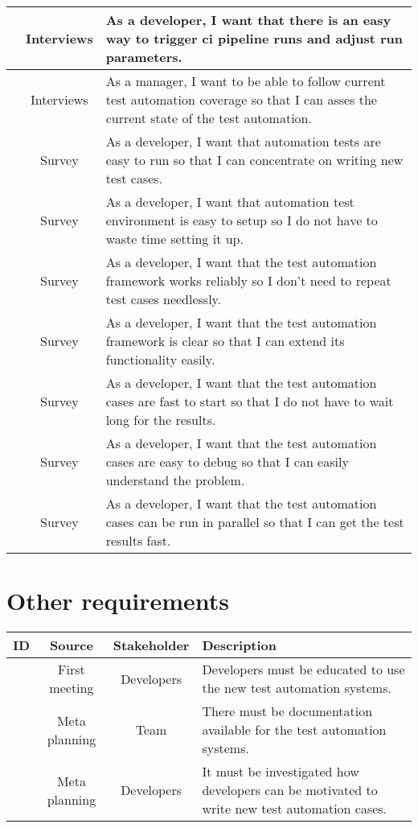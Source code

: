 \begin{center}
\begin{xltabular}{\textwidth}{|c|c|X|}
		\hline
		\reid & Interviews & As a developer, I want that there is an easy way to trigger \gls{ci} pipeline runs and adjust run parameters.\\
		\hline
		\reid & Interviews & As a manager, I want to be able to follow current test automation coverage so that I can asses the current state of the test automation.\\
		\hline
		\reid & Survey & As a developer, I want that automation tests are easy to run so that I can concentrate on writing new test cases.\\
		\hline
		\reid & Survey & As a developer, I want that automation test environment is easy to setup so I do not have to waste time setting it up.\\
		\hline
		\reid & Survey & As a developer, I want that the test automation framework works reliably so I don't need to repeat test cases needlessly.\\
		\hline
		\reid & Survey & As a developer, I want that the test automation framework is clear so that I can extend its functionality easily.\\
		\hline
		\reid & Survey & As a developer, I want that the test automation cases are fast to start so that I do not have to wait long for the results.\\
		\hline
		\reid & Survey & As a developer, I want that the test automation cases are easy to debug so that I can easily understand the problem.\\
		\hline
		\reid & Survey & As a developer, I want that the test automation cases can be run in parallel so that I can get the test results fast.\\
		\hline
	\end{xltabular}
\end{center}

\section*{Other requirements}
\begin{center}
	\begin{tabularx}{\textwidth}{|c|c|c|X|}
		\hline
		\textbf{ID} & \textbf{Source} & \textbf{Stakeholder} & \textbf{Description}\\
		\hline
		\reid & First meeting & Developers & Developers must be educated to use the new test automation systems.\\
		\hline
		\reid & Meta planning & Team & There must be documentation available for the test automation systems.\\
		\hline
		\reid & Meta planning & Developers & It must be investigated how developers can be motivated to write new test automation cases.\\
		\hline
	\end{tabularx}
\end{center}